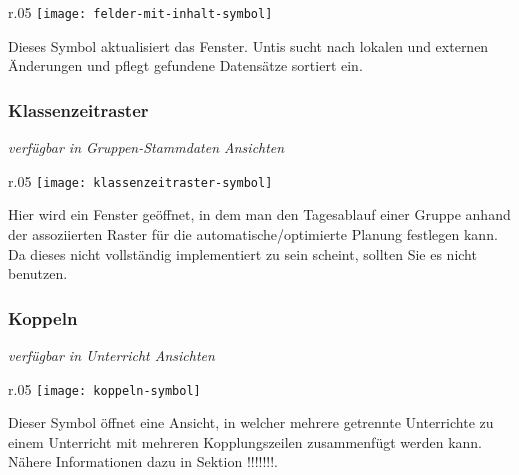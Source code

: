 \begin{wrapfigure}{r}{.05\textwidth}
	\vspace{-50pt}
	\texttt{[image: felder-mit-inhalt-symbol]}
	\vspace{-35pt}
\end{wrapfigure}

\noindent
Dieses Symbol aktualisiert das Fenster. Untis sucht nach lokalen und externen Änderungen und pflegt gefundene Datensätze sortiert ein.\\

\newpage

\subsubsection{Klassenzeitraster}
{\small\textit{verfügbar in Gruppen-Stammdaten Ansichten\\}\par}

\begin{wrapfigure}{r}{.05\textwidth}
	\vspace{-50pt}
	\texttt{[image: klassenzeitraster-symbol]}
	\vspace{-35pt}
\end{wrapfigure}

\noindent
Hier wird ein Fenster geöffnet, in dem man den Tagesablauf einer Gruppe anhand der assoziierten Raster für die automatische/optimierte Planung festlegen kann. Da dieses nicht vollständig implementiert zu sein scheint, sollten Sie es nicht benutzen.\\

\subsubsection{Koppeln}
{\small\textit{verfügbar in Unterricht Ansichten\\}\par}

\begin{wrapfigure}{r}{.05\textwidth}
	\vspace{-50pt}
	\texttt{[image: koppeln-symbol]}
	\vspace{-35pt}
\end{wrapfigure}

\noindent
Dieser Symbol öffnet eine Ansicht, in welcher mehrere getrennte Unterrichte zu einem Unterricht mit mehreren Kopplungszeilen zusammenfügt werden kann. Nähere Informationen dazu in Sektion !!!!!!!.\\

